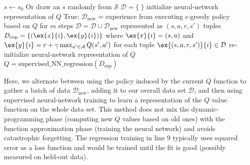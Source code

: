 \begin{codebox}
  \li $s \gets s_0$ \Comment Or draw an $s$ randomly from $\mathcal S$
  \li $\mathcal D = \{\;\}$
  \li initialize neural-network representation of $Q$
  \li \While True: \Do
  \li  $\mathcal D_\text{new}$ = experience from executing $\epsilon$-greedy policy based
  on $Q$ for $m$ steps
\li $\mathcal D = \mathcal D \cup \mathcal D_\text{new}$ represented
as $(s, a, r, s')$ tuples
\li $D_\text{sup} = \{(\ex{x}{i}, \ex{y}{i})\}$  where $\ex{x}{i} =
(s, a)$ and $\ex{y}{i} = r + \gamma \max_{a' \in \mathcal A} Q(s',
a')$ 
  \li \;\;\;for each tuple $\ex{(s, a, r, s')}{i} \in \mathcal D$ 
  \li re-initialize neural-network representation of $Q$
  \li $Q = \text{supervised\_NN\_regression}(D_\text{sup})$
\End
\end{codebox}

Here, we alternate between using the policy induced  by the current
$Q$ function to gather a batch of data $\mathcal D_\text{new}$, adding
it to our overall data set $\mathcal D$, and then using supervised
neural-network training to learn a representation of the $Q$ value
function on the whole data set.  This method does not mix the
dynamic-programming phase (computing new $Q$ values based on old ones)
with the function approximation phase (training the neural network)
and avoids catastrophic forgetting.  The regression training in line 9
typically uses squared error as a loss function and would be trained
until the fit is good (possibly measured on held-out data).



